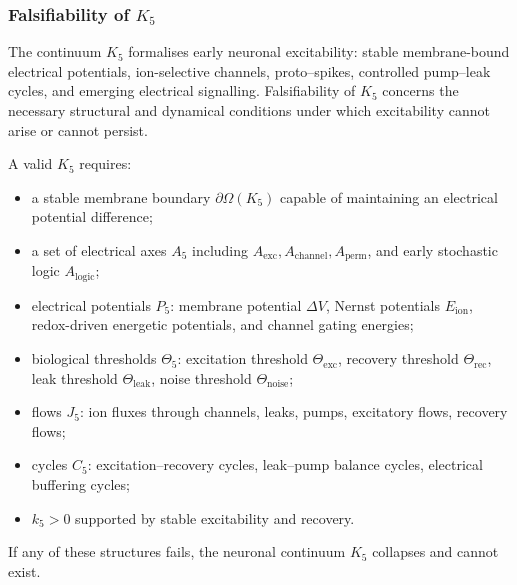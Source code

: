 
\subsubsection{Falsifiability of \texorpdfstring{$K_5$}{K_5}}
\label{sec:falsifiability-k5}

The continuum $K_5$ formalises early neuronal excitability:
stable membrane-bound electrical potentials, ion-selective channels,
proto–spikes, controlled pump–leak cycles, and emerging electrical
signalling.
Falsifiability of $K_5$ concerns the necessary structural and dynamical
conditions under which excitability cannot arise or cannot persist.

A valid $K_5$ requires:

\begin{itemize}
    \item a stable membrane boundary $\partial\Omega(K_5)$ capable
          of maintaining an electrical potential difference;
    \item a set of electrical axes $A_5$ including
          $A_{\mathrm{exc}}, A_{\mathrm{channel}}, A_{\mathrm{perm}}$,
          and early stochastic logic $A_{\mathrm{logic}}$;
    \item electrical potentials $P_5$:
          membrane potential $\Delta V$, Nernst potentials $E_{\mathrm{ion}}$,
          redox-driven energetic potentials, and channel gating energies;
    \item biological thresholds $\Theta_5$:
          excitation threshold $\Theta_{\mathrm{exc}}$,
          recovery threshold $\Theta_{\mathrm{rec}}$,
          leak threshold $\Theta_{\mathrm{leak}}$,
          noise threshold $\Theta_{\mathrm{noise}}$;
    \item flows $J_5$: ion fluxes through channels, leaks,
          pumps, excitatory flows, recovery flows;
    \item cycles $C_5$: excitation–recovery cycles,
          leak–pump balance cycles, electrical buffering cycles;
    \item $k_5>0$ supported by stable excitability and recovery.
\end{itemize}

If any of these structures fails, the neuronal continuum $K_5$
collapses and cannot exist.



